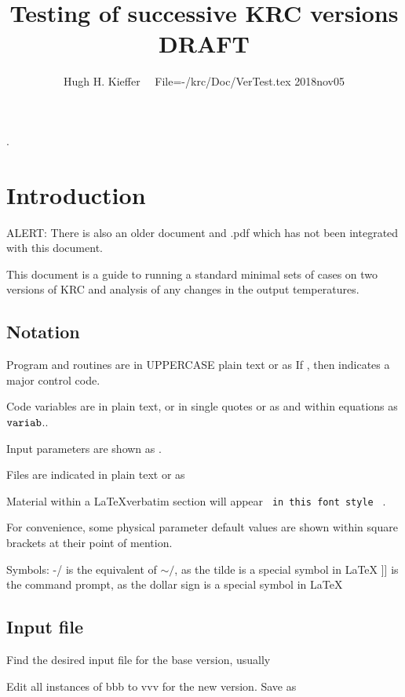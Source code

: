 \documentclass{article}
\title{Testing of successive KRC versions   DRAFT}
\author{Hugh H. Kieffer  \ \ File=-/krc/Doc/VerTest.tex 2018nov05}
\begin{document}
\maketitle
\tableofcontents
\hrulefill .\hrulefill

\section{Introduction}
ALERT: There is also an older document  and .pdf which has not been integrated with this document. 

This document is a guide to running a standard minimal sets of cases on two versions of KRC and analysis of any changes in the output temperatures.

\subsection{Notation}
Program and routines are in UPPERCASE plain text or as  
\qi If  , then  indicates a major control code. 

Code variables are in plain text, or in single quotes or as  and within equations as $\mathtt{variab}$.. 

Input parameters are shown as . %

Files are indicated in plain text or as  

Material within a \LaTeX verbatim section will appear \verb+ in this font style + .

For convenience, some physical parameter default values are shown within square
brackets at their point of mention.

Symbols: 
\qi -/ is the equivalent of $\sim /$, as the tilde is a special symbol in LaTeX
\qi ]] is the command prompt, as the dollar sign is a special symbol in LaTeX

\subsection{Input file}

Find the desired input file for the base version, usually  

Edit all instances of bbb to vvv for the new version. Save as  
\end{document}
